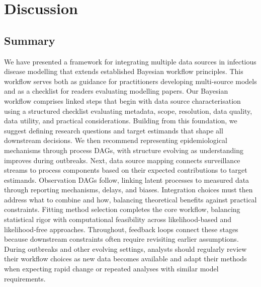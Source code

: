 \documentclass{article}
\begin{document}
\section{Discussion}

\subsection{Summary}

We have presented a framework for integrating multiple data sources in infectious disease modelling that extends established Bayesian workflow principles.
This workflow serves both as guidance for practitioners developing multi-source models and as a checklist for readers evaluating modelling papers.
Our Bayesian workflow comprises linked steps that begin with data source characterisation using a structured checklist evaluating metadata, scope, resolution, data quality, data utility, and practical considerations.
Building from this foundation, we suggest defining research questions and target estimands that shape all downstream decisions.
We then recommend representing epidemiological mechanisms through process DAGs, with structure evolving as understanding improves during outbreaks.
Next, data source mapping connects surveillance streams to process components based on their expected contributions to target estimands.
Observation DAGs follow, linking latent processes to measured data through reporting mechanisms, delays, and biases.
Integration choices must then address what to combine and how, balancing theoretical benefits against practical constraints.
Fitting method selection completes the core workflow, balancing statistical rigor with computational feasibility across likelihood-based and likelihood-free approaches.
Throughout, feedback loops connect these stages because downstream constraints often require revisiting earlier assumptions.
During outbreaks and other evolving settings, analysts should regularly review their workflow choices as new data becomes available and adapt their methods when expecting rapid change or repeated analyses with similar model requirements.
\end{document}
